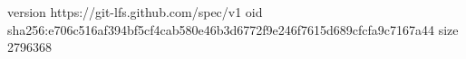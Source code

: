 version https://git-lfs.github.com/spec/v1
oid sha256:e706c516af394bf5cf4cab580e46b3d6772f9e246f7615d689cfcfa9c7167a44
size 2796368
